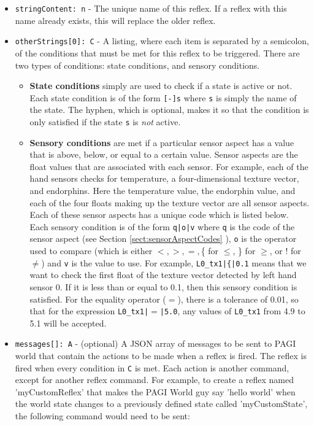 \begin{itemize}
\item \texttt{stringContent: n} - The unique name of this reflex. If a reflex with this name already exists, this will replace the older reflex.
\item \texttt{otherStrings[0]: C} - A listing, where each item is separated by a semicolon, of the conditions that must be met for this reflex to be triggered. There are two types of conditions: state conditions, and sensory conditions. 
	\begin{itemize}
	\item \textbf{State conditions} simply are used to check if a state is active or not. Each state condition is of the form \texttt{[-]s} where \texttt{s} is simply the name of the state. The hyphen, which is optional, makes it so that the condition is only satisfied if the state \texttt{s} is \textit{not} active.
	\item \textbf{Sensory conditions} are met if a particular sensor aspect has a value that is above, below, or equal to a certain value. Sensor aspects are the float values that are associated with each sensor. For example, each of the hand sensors checks for temperature, a four-dimensional texture vector, and endorphins. Here the temperature value, the endorphin value, and each of the four floats making up the texture vector are all sensor aspects. Each of these sensor aspects has a unique code which is listed below.\\
	Each sensory condition is of the form \texttt{q|o|v} where \texttt{q} is the code of the sensor aspect (see Section \ref{sect:sensorAspectCodes} ), \texttt{o} is the operator used to compare (which is either $<, >, =,$\{  for $\leq$, \} for $\geq$, or ! for $\neq$) and \texttt{v} is the value to use. For example, \texttt{L0\_tx1|\{|0.1} means that we want to check the first float of the texture vector detected by left hand sensor 0. If it is less than or equal to 0.1, then this sensory condition is satisfied. For the equality operator ($=$), there is a tolerance of 0.01, so that for the expression \texttt{L0\_tx1|$=$|5.0}, any values of \texttt{L0\_tx1} from 4.9 to 5.1 will be accepted.
	\end{itemize}
\item \texttt{messages[]: A} - (optional) A JSON array of messages to be sent to PAGI world that contain the actions to be made when a reflex is fired. The reflex is fired when every condition in \texttt{C} is met. Each action is another command, except for another reflex command. For example, to create a reflex named 'myCustomReflex' that makes the PAGI World guy say 'hello world' when the world state changes to a previously defined state called 'myCustomState', the following command would need to be sent:


\end{itemize}
